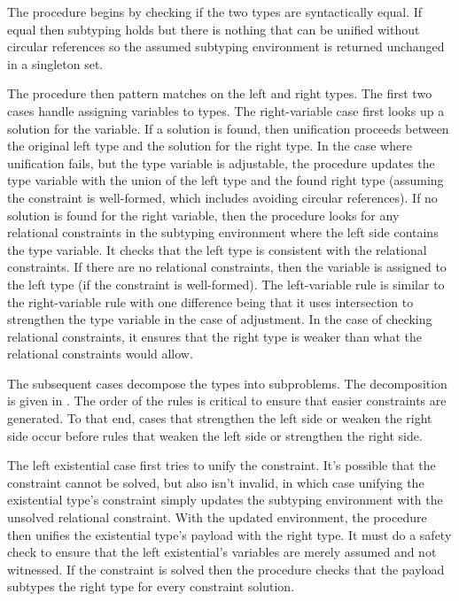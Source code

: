 \documentclass[acmsmall]{acmart}
\begin{document}
The procedure begins by checking if the two types are syntactically equal.
If equal then subtyping holds but there is nothing that can be unified 
without circular references so the assumed subtyping environment is returned 
unchanged in a singleton set. 

The procedure then pattern matches on the left and right types. 
The first two cases handle assigning variables to types.
The right-variable case first looks up a solution  
for the variable. If a solution is found, then unification proceeds
between the original left type and the solution for the right type.
In the case where unification fails, but the type variable is adjustable,
the procedure updates the type variable with the union of the left type
and the found right type (assuming the constraint is well-formed, 
which includes avoiding circular references). 
If no solution is found for the right variable, then 
the procedure looks for any relational constraints in the subtyping environment
where the left side contains the type variable.
It checks that the left type is consistent with the relational constraints. 
If there are no relational constraints, then the variable is assigned
to the left type (if the constraint is well-formed).
The left-variable rule is similar to the right-variable rule with
one difference being that it uses intersection to strengthen the type variable 
in the case of adjustment. In the case of checking relational constraints, it
ensures that the right type is weaker than what the relational constraints would allow. 

The subsequent cases decompose the types into subproblems. 
The decomposition is given in . 
The order of the rules 
is critical to ensure that easier constraints are generated. To that end, cases that
strengthen the left side or weaken the right side occur before rules that
weaken the left side or strengthen the right side.

The left existential case first tries to unify the constraint. It's possible that the
constraint cannot be solved, but also isn't invalid, in which case unifying the existential type's constraint 
simply updates the subtyping environment with the unsolved relational constraint. 
With the updated environment, the procedure then unifies the existential type's payload with the right type.
It must do a safety check to ensure that 
the left existential's variables are merely assumed and not witnessed. 
If the constraint is solved then the procedure 
checks that the payload subtypes the right type for every constraint solution.
\end{document}
